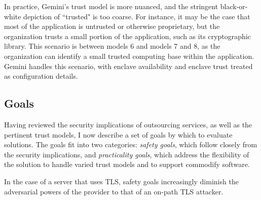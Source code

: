 
In practice, Gemini's trust model is more nuanced, and the stringent
black-or-white depiction of ``trusted" is too coarse.
%
For instance, it may be the case that most of the application is untrusted or
otherwise proprietary, but the organization trusts a small portion of the
application, such as its cryptographic library.
%
This scenario is between models 6 and models 7 and 8, as the organization can
identify a small trusted computing base within the application.
%
Gemini handles this scenario, with enclave availability and enclave trust
treated as configuration details.


\subsection{Goals}

Having reviewed the security implications of outsourcing services, as well as
the pertinent trust models, I now describe a set of goals by which to evaluate
solutions.
%
The goals fit into two categories: \emph{safety goals}, which follow closely
from the security implications, and \emph{practicality goals}, which address
the flexibility of the solution to handle varied trust models and to support
commodify software.

%
In the case of a server that uses TLS, safety goals increasingly diminish the
adversarial powers of the provider to that of an on-path TLS attacker.

